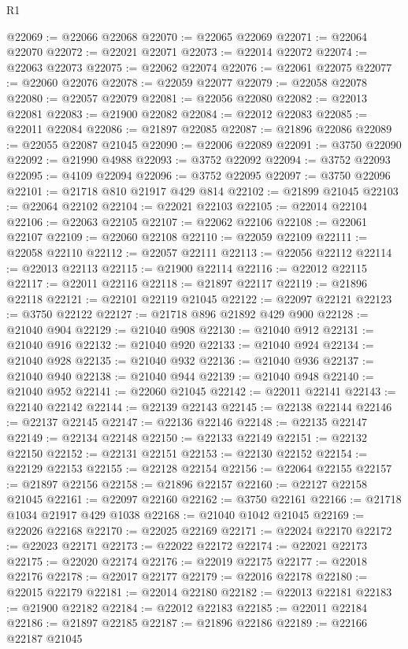 \begin{lexlean}{R1}
\begin{coremodule}
@22069 := @22066 @22068
@22070 := @22065 @22069
@22071 := @22064 @22070
@22072 := @22021 @22071
@22073 := @22014 @22072
@22074 := @22063 @22073
@22075 := @22062 @22074
@22076 := @22061 @22075
@22077 := @22060 @22076
@22078 := @22059 @22077
@22079 := @22058 @22078
@22080 := @22057 @22079
@22081 := @22056 @22080
@22082 := @22013 @22081
@22083 := @21900 @22082
@22084 := @22012 @22083
@22085 := @22011 @22084
@22086 := @21897 @22085
@22087 := @21896 @22086
@22089 := @22055 @22087 @21045
@22090 := @22006 @22089
@22091 := @3750 @22090
@22092 := @21990 @4988
@22093 := @3752 @22092
@22094 := @3752 @22093
@22095 := @4109 @22094
@22096 := @3752 @22095
@22097 := @3750 @22096
@22101 := @21718 @810 @21917 @429 @814
@22102 := @21899 @21045
@22103 := @22064 @22102
@22104 := @22021 @22103
@22105 := @22014 @22104
@22106 := @22063 @22105
@22107 := @22062 @22106
@22108 := @22061 @22107
@22109 := @22060 @22108
@22110 := @22059 @22109
@22111 := @22058 @22110
@22112 := @22057 @22111
@22113 := @22056 @22112
@22114 := @22013 @22113
@22115 := @21900 @22114
@22116 := @22012 @22115
@22117 := @22011 @22116
@22118 := @21897 @22117
@22119 := @21896 @22118
@22121 := @22101 @22119 @21045
@22122 := @22097 @22121
@22123 := @3750 @22122
@22127 := @21718 @896 @21892 @429 @900
@22128 := @21040 @904
@22129 := @21040 @908
@22130 := @21040 @912
@22131 := @21040 @916
@22132 := @21040 @920
@22133 := @21040 @924
@22134 := @21040 @928
@22135 := @21040 @932
@22136 := @21040 @936
@22137 := @21040 @940
@22138 := @21040 @944
@22139 := @21040 @948
@22140 := @21040 @952
@22141 := @22060 @21045
@22142 := @22011 @22141
@22143 := @22140 @22142
@22144 := @22139 @22143
@22145 := @22138 @22144
@22146 := @22137 @22145
@22147 := @22136 @22146
@22148 := @22135 @22147
@22149 := @22134 @22148
@22150 := @22133 @22149
@22151 := @22132 @22150
@22152 := @22131 @22151
@22153 := @22130 @22152
@22154 := @22129 @22153
@22155 := @22128 @22154
@22156 := @22064 @22155
@22157 := @21897 @22156
@22158 := @21896 @22157
@22160 := @22127 @22158 @21045
@22161 := @22097 @22160
@22162 := @3750 @22161
@22166 := @21718 @1034 @21917 @429 @1038
@22168 := @21040 @1042 @21045
@22169 := @22026 @22168
@22170 := @22025 @22169
@22171 := @22024 @22170
@22172 := @22023 @22171
@22173 := @22022 @22172
@22174 := @22021 @22173
@22175 := @22020 @22174
@22176 := @22019 @22175
@22177 := @22018 @22176
@22178 := @22017 @22177
@22179 := @22016 @22178
@22180 := @22015 @22179
@22181 := @22014 @22180
@22182 := @22013 @22181
@22183 := @21900 @22182
@22184 := @22012 @22183
@22185 := @22011 @22184
@22186 := @21897 @22185
@22187 := @21896 @22186
@22189 := @22166 @22187 @21045

\end{coremodule}
\end{lexlean}

